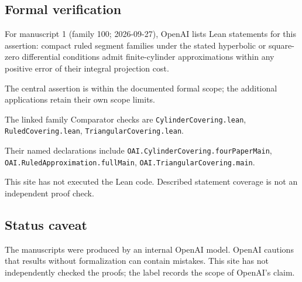 \documentclass[11pt]{article}
\begin{document}
\subsection{Formal verification}
For manuscript 1 (family 100; 2026-09-27), OpenAI lists Lean statements for this assertion: compact ruled segment families under the stated hyperbolic or square-zero differential conditions admit finite-cylinder approximations within any positive error of their integral projection cost.

The central assertion is within the documented formal scope; the additional applications retain their own scope limits.

The linked family Comparator checks are \texttt{CylinderCovering.lean}, \texttt{RuledCovering.lean}, \texttt{TriangularCovering.lean}.

Their named declarations include \texttt{OAI.CylinderCovering.fourPaperMain}, \texttt{OAI.RuledApproximation.fullMain}, \texttt{OAI.TriangularCovering.main}.

This site has not executed the Lean code. Described statement coverage is not an independent proof check.

\subsection{Status caveat}
The manuscripts were produced by an internal OpenAI model. OpenAI cautions that results without formalization can contain mistakes. This site has not independently checked the proofs; the label records the scope of OpenAI's claim.
\end{document}
